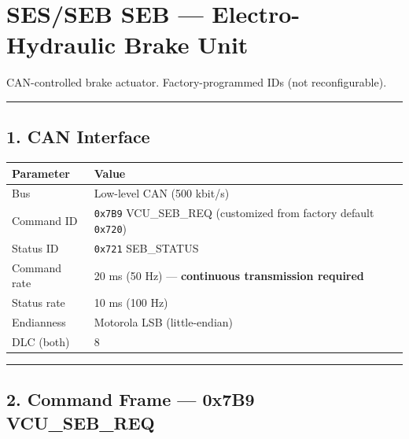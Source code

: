 \documentclass[12pt,a4paper,oneside]{report}
\begin{document}
\chapter{SES/SEB SEB --- Electro-Hydraulic Brake
Unit}\label{SES/SEB-seb-electro-hydraulic-brake-unit}

CAN-controlled brake actuator. Factory-programmed IDs (not reconfigurable).

\begin{center}\rule{0.5\linewidth}{0.5pt}\end{center}

\section{1. CAN Interface}\label{can-interface}

\begin{longtable}[]{@{}ll@{}}
\toprule\noalign{}
Parameter & Value \\
\midrule\noalign{}
\endhead
\bottomrule\noalign{}
\endlastfoot
Bus & Low-level CAN (500 kbit/s) \\
Command ID & \texttt{0x7B9} VCU\_SEB\_REQ (customized from factory default
\texttt{0x720}) \\
Status ID & \texttt{0x721} SEB\_STATUS \\
Command rate & 20 ms (50 Hz) --- \textbf{continuous transmission required} \\
Status rate & 10 ms (100 Hz) \\
Endianness & Motorola LSB (little-endian) \\
DLC (both) & 8 \\
\end{longtable}

\begin{center}\rule{0.5\linewidth}{0.5pt}\end{center}

\section{2. Command Frame --- 0x7B9
VCU\_SEB\_REQ}\label{command-frame-0x7b9-vcu_seb_req}
\end{document}
